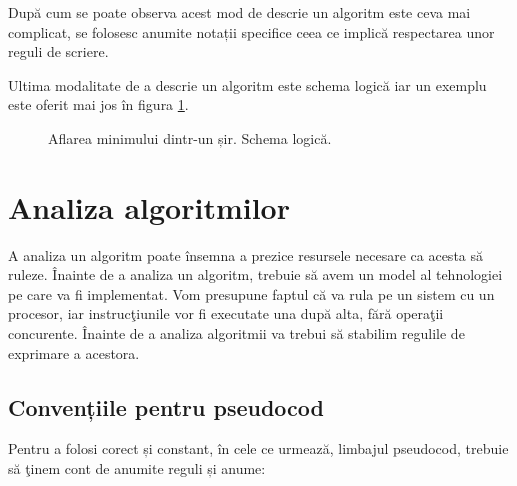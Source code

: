 După cum se poate observa acest mod de descrie un algoritm este ceva mai complicat, se folosesc anumite notații specifice ceea ce implică respectarea unor reguli de scriere. 

Ultima modalitate de a descrie un algoritm este schema logică iar un exemplu este oferit mai jos în figura \ref{fig:schemalogica}.

\begin{figure}[H] %
	\centering	
	{
	}
	\caption{Aflarea minimului dintr-un șir. Schema logică.} 
	\label{fig:schemalogica}
\end{figure}




\pagebreak



\section{Analiza algoritmilor}

A analiza un algoritm poate însemna a prezice resursele necesare ca acesta să ruleze.
Înainte de a analiza un algoritm, trebuie să avem un model al tehnologiei pe care va fi
implementat. Vom presupune faptul că va rula pe un sistem cu un procesor, iar instrucţiunile vor fi
executate una după alta, fără operaţii concurente. 
Înainte de a analiza algoritmii va trebui să stabilim regulile de exprimare a acestora. 

\subsection{Convențiile pentru pseudocod}

Pentru a folosi corect și constant, în cele ce urmează, limbajul pseudocod, trebuie să ţinem cont
de anumite reguli și anume:


